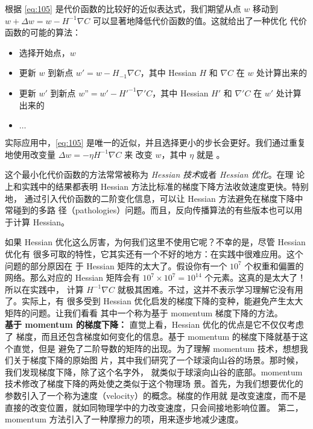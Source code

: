 根据 \eqref{eq:105} 是代价函数的比较好的近似表达式，我们期望从点 $w$ 移动到
$w+\Delta w = w - H^{-1}\nabla C$ 可以显著地降低代价函数的值。这就给出了一种优化
代价函数的可能的算法：
\begin{itemize}
\item 选择开始点，$w$
\item 更新 $w$ 到新点 $w' = w - H_{-1}\nabla C$，其中 Hessian $H$ 和 $\nabla C$
  在 $w$ 处计算出来的
\item 更新 $w'$ 到新点 $w” = w' - H'^{-1}\nabla' C$，其中 Hessian $H'$ 和
  $\nabla' C$ 在 $w'$ 处计算出来的
\item $\ldots$
\end{itemize}

实际应用中，\eqref{eq:105} 是唯一的近似，并且选择更小的步长会更好。我们通过重复
地使用改变量 $\Delta w = -\eta H^{-1} \nabla C$ 来 改变 $w$，其中 $\eta$ 就是
\learningrate{}。

这个最小化代价函数的方法常常被称为 \emph{Hessian 技术}或者 \emph{Hessian 优化}。在理
论上和实践中的结果都表明 Hessian 方法比标准的梯度下降方法收敛速度更快。特别地，
通过引入代价函数的二阶变化信息，可以让 Hessian 方法避免在梯度下降中常碰到的多路
径（pathologies）问题。而且，反向传播算法的有些版本也可以用于计算 Hessian。

如果 Hessian 优化这么厉害，为何我们这里不使用它呢？不幸的是，尽管 Hessian 优化有
很多可取的特性，它其实还有一个不好的地方：在实践中很难应用。这个问题的部分原因在
于 Hessian 矩阵的太大了。假设你有一个 $10^7$ 个权重和偏置的网络。那么对应的
Hessian 矩阵会有 $10^7 \times 10^7=10^14$ 个元素。这真的是太大了！所以在实践中，
计算 $H^{-1}\nabla C$ 就极其困难。不过，这并不表示学习理解它没有用了。实际上，有
很多受到 Hessian 优化启发的梯度下降的变种，能避免产生太大矩阵的问题。让我们看看
其中一个称为基于 momentum 梯度下降的方法。
\\

\textbf{基于 momentum 的梯度下降：} 直觉上看，Hessian 优化的优点是它不仅仅考虑了
梯度，而且还包含梯度如何变化的信息。基于 momentum 的梯度下降就基于这个直觉，但是
避免了二阶导数的矩阵的出现。为了理解 momentum 技术，想想我们关于梯度下降的原始图
片，其中我们研究了一个球滚向山谷的场景。那时候，我们发现梯度下降，除了这个名字外，
就类似于球滚向山谷的底部。momentum 技术修改了梯度下降的两处使之类似于这个物理场
景。首先，为我们想要优化的参数引入了一个称为速度（velocity）的概念。梯度的作用就
是改变速度，而不是直接的改变位置，就如同物理学中的力改变速度，只会间接地影响位置。
第二，momentum 方法引入了一种摩擦力的项，用来逐步地减少速度。

